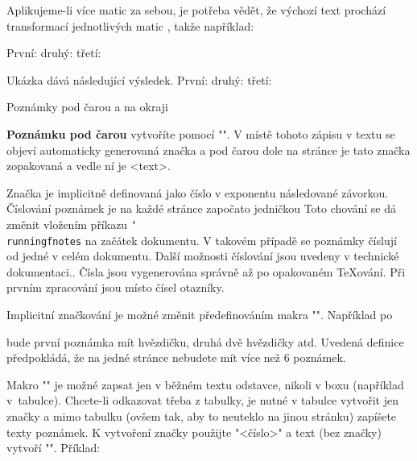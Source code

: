 Aplikujeme-li více matic za sebou, je potřeba vědět, že výchozí text
prochází transformací jednotlivých matic , takže
například:

\begtt
První: \pdfsave {}\pdfrestore
druhý: \pdfsave {}\pdfrestore
třetí: \pdfsave {}%
       \pdfrestore %
\endtt

\bigskip
Ukázka dává následující výsledek. První: 
  \pdfsave {}\pdfrestore
druhý:
  \pdfsave {}\pdfrestore
třetí: 
  \pdfsave {}%
       \pdfrestore 
\bigskip\bigskip



\sec Poznámky pod čarou a na okraji

{\bf Poznámku pod čarou} 
vytvoříte pomocí "". V místě tohoto zápisu
v textu se objeví automaticky generovaná značka a pod čarou dole na stránce
je tato značka zopakovaná a vedle ní je <text>. 

Značka je implicitně definovaná jako číslo v exponentu
následované závorkou. Číslování poznámek je na každé stránce započato
jedničkou\fnote
{Toto chování se dá změnit vložením příkazu {\tt\char`\\runningfnotes} na
začátek dokumentu. V takovém případě se poznámky číslují od jedné v celém
dokumentu. Další možnosti číslování jsou uvedeny v technické dokumentaci.}.
Čísla jsou vygenerována správně až po
opakovaném \TeX{}ování. Při prvním zpracování jsou místo čísel otazníky.

Implicitní značkování je možné změnit předefinováním makra "\thefnote".
Například po

\begtt
\def\thefnote{\ifcase\locfnum\or
   *\or**\or***\or$^{\dag}$\or$^{\ddag}$\or$^{\dag\dag}$\fi}
\endtt
%
bude první poznámka mít hvězdičku, druhá dvě hvězdičky atd. Uvedená
definice předpokládá, že na jedné stránce nebudete mít více než 6 poznámek.

Makro "\fnote" je možné zapsat jen v běžném textu odstavce, nikoli v boxu
(například v~tabulce). Chcete-li odkazovat třeba z tabulky, je nutné v
tabulce vytvořit jen značky a mimo tabulku (ovšem tak, aby to neuteklo na
jinou stránku) zapíšete texty poznámek. K vytvoření značky použijte
"\fnotemark<číslo>" a text (bez značky) vytvoří "".
Příklad:

